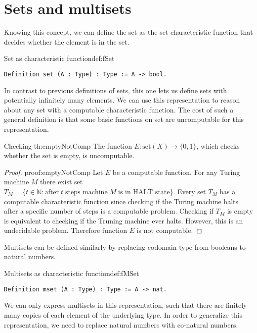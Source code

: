 \section{Sets and multisets}
Knowing this concept, we can define the set as the set characteristic function that decides whether the element is in the set.
\begin{defi}{Set as characteristic function}{def:fSet}
\begin{verbatim}
Definition set (A : Type) : Type := A -> bool.
\end{verbatim}
\end{defi}
In contrast to previous definitions of sets, this one lets us define sets with potentially infinitely many elements. We can use this representation to reason about any set with a computable characteristic function. The cost of such a general definition is that some basic functions on set are uncomputable for this representation.
\begin{theo}{Checking }{th:emptyNotComp}
The function $E : \textrm{set}(X) \rightarrow \{0, 1\}$, which checks whether the set is empty, is uncomputable.
\end{theo}
\begin{proof}{}{proof:emptyNotComp}
Let $E$ be a computable function. For any Turing machine $M$ there exist set $T_M = \{t \in \mathbb{N} : \textrm{after} \; t \; \textrm{steps machine} \; M \; \textrm{is in HALT state}\}$. Every set $T_M$ has a computable characteristic function since checking if the Turing machine halts after a specific number of steps is a computable problem. Checking if $T_M$ is empty is equivalent to checking if the Truning machine ever halts. However, this is an undecidable problem. Therefore function $E$ is not computable. \phantom{dasd} \contradiction
\end{proof}
Multisets can be defined similarly by replacing codomain type from booleans to natural numbers.
\begin{defi}{Multisets as characteristic function}{def:fMSet}
\begin{verbatim}
Definition mset (A : Type) : Type := A -> nat.
\end{verbatim}
\end{defi}
We can only express multisets in this representation, such that there are finitely many copies of each element of the underlying type. In order to generalize this representation, we need to replace natural numbers with co-natural numbers.
